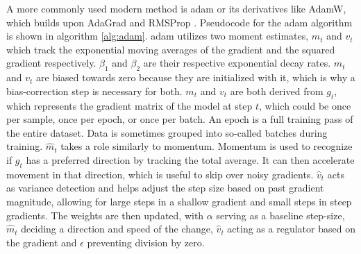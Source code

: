 A more commonly used modern method is \ac{adam} \cite{Kingma.2015} or its derivatives like AdamW, which builds upon AdaGrad \cite{Duchi.2011} and RMSProp \cite{Tieleman.2012}.
Pseudocode for the \ac{adam} algorithm is shown in algorithm \ref{alg:adam}.
\ac{adam} utilizes two moment estimates, $m_t$ and $v_t$ which track the exponential moving averages of the gradient and the squared gradient respectively.
$\beta_1$ and $\beta_2$ are their respective exponential decay rates.
$m_t$ and $v_t$ are biased towards zero because they are initialized with it, which is why a bias-correction step is necessary for both.
$m_t$ and $v_t$ are both derived from $g_t$, which represents the gradient matrix of the model at step $t$, which could be once per sample, once per epoch, or once per batch.
An epoch is a full training pass of the entire dataset.
Data is sometimes grouped into so-called batches during training.
$\widehat{m}_t$ takes a role similarly to momentum.
Momentum is used to recognize if $g_t$ has a preferred direction by tracking the total average.
It can then accelerate movement in that direction, which is useful to skip over noisy gradients.
$\widehat{v}_t$ acts as variance detection and helps adjust the step size based on past gradient magnitude, allowing for large steps in a shallow gradient and small steps in steep gradients.
The weights are then updated, with $\alpha$ serving as a baseline step-size, $\widehat{m}_t$ deciding a direction and speed of the change, $\widehat{v}_t$ acting as a regulator based on the gradient and $\epsilon$ preventing division by zero. \cite{Kingma.2015}

